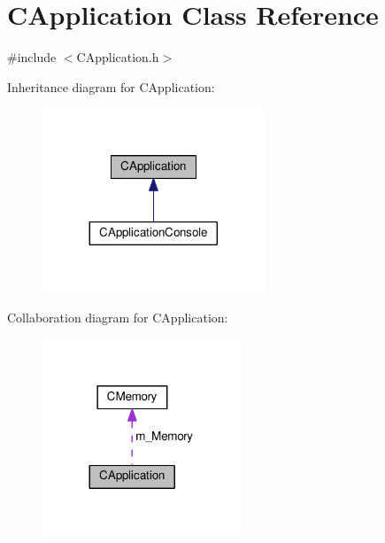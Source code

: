 \hypertarget{classCApplication}{}\section{C\+Application Class Reference}
\label{classCApplication}


{\ttfamily \#include $<$C\+Application.\+h$>$}



Inheritance diagram for C\+Application\+:\nopagebreak
\begin{figure}[H]
\begin{center}
\leavevmode
\includegraphics[width=188pt]{classCApplication__inherit__graph}
\end{center}
\end{figure}


Collaboration diagram for C\+Application\+:\nopagebreak
\begin{figure}[H]
\begin{center}
\leavevmode
\includegraphics[width=168pt]{classCApplication__coll__graph}
\end{center}
\end{figure}
